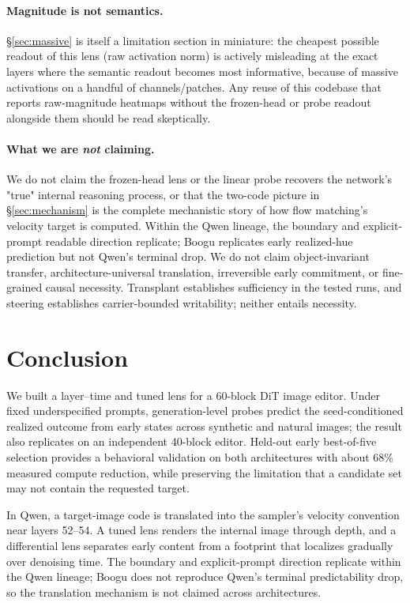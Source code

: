 \documentclass[10pt,twocolumn,letterpaper]{article}
\begin{document}
\paragraph{Magnitude is not semantics.} \S\ref{sec:massive} is itself a
limitation section in miniature: the cheapest possible readout of
this lens (raw activation norm) is actively misleading at the exact
layers where the semantic readout becomes most informative, because of
massive activations on a handful of channels/patches. Any reuse of this
codebase that reports raw-magnitude heatmaps without the frozen-head or
probe readout alongside them should be read skeptically.

\paragraph{What we are \emph{not} claiming.} We do not claim the
frozen-head lens or the linear probe recovers the network's "true"
internal reasoning process, or that the two-code picture in
\S\ref{sec:mechanism} is the complete mechanistic story of how flow
matching's velocity target is computed. Within the Qwen lineage, the
boundary and explicit-prompt readable direction replicate; Boogu
replicates early realized-hue prediction but not Qwen's terminal drop.
We do not claim object-invariant transfer, architecture-universal
translation, irreversible early commitment, or fine-grained causal
necessity. Transplant establishes sufficiency in the tested runs, and
steering establishes carrier-bounded writability; neither entails
necessity.

\section{Conclusion}\label{sec:conclusion}

We built a layer--time and tuned lens for a 60-block DiT image editor.
Under fixed underspecified prompts, generation-level probes predict the
seed-conditioned realized outcome from early states across synthetic and
natural images; the result also replicates on an independent 40-block
editor. Held-out early best-of-five selection provides a behavioral
validation on both architectures with about 68\% measured compute reduction,
while preserving the limitation that a candidate set may not
contain the requested target.

In Qwen, a target-image code is translated into the sampler's velocity
convention near layers 52--54. A tuned lens renders the internal image
through depth, and a differential lens separates early content from a
footprint that localizes gradually over denoising time. The boundary and
explicit-prompt direction replicate within the Qwen lineage; Boogu does
not reproduce Qwen's terminal predictability drop, so the translation
mechanism is not claimed across architectures.
\end{document}
